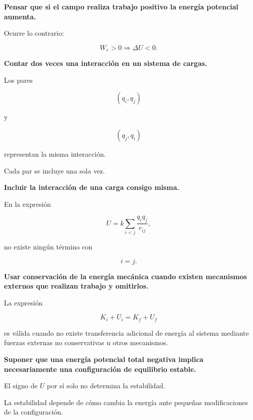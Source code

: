 \begin{errorfrecuente}

\textbf{Pensar que si el campo realiza trabajo positivo la energía potencial aumenta.}

Ocurre lo contrario:

\[
W_e>0
\Longrightarrow
\Delta U<0.
\]

\end{errorfrecuente}


\begin{errorfrecuente}

\textbf{Contar dos veces una interacción en un sistema de cargas.}

Los pares

\[
(q_i,q_j)
\]

y

\[
(q_j,q_i)
\]

representan la misma interacción.

Cada par se incluye una sola vez.

\end{errorfrecuente}


\begin{errorfrecuente}

\textbf{Incluir la interacción de una carga consigo misma.}

En la expresión

\[
U=k\sum_{i<j}\frac{q_iq_j}{r_{ij}},
\]

no existe ningún término con

\[
i=j.
\]

\end{errorfrecuente}


\begin{errorfrecuente}

\textbf{Usar conservación de la energía mecánica cuando existen mecanismos externos
que realizan trabajo y omitirlos.}

La expresión

\[
K_i+U_i=K_f+U_f
\]

es válida cuando no existe transferencia adicional de energía al sistema mediante
fuerzas externas no conservativas u otros mecanismos.

\end{errorfrecuente}


\begin{errorfrecuente}

\textbf{Suponer que una energía potencial total negativa implica necesariamente una
configuración de equilibrio estable.}

El signo de \(U\) por sí solo no determina la estabilidad.

La estabilidad depende de cómo cambia la energía ante pequeñas modificaciones de la
configuración.

\end{errorfrecuente}



